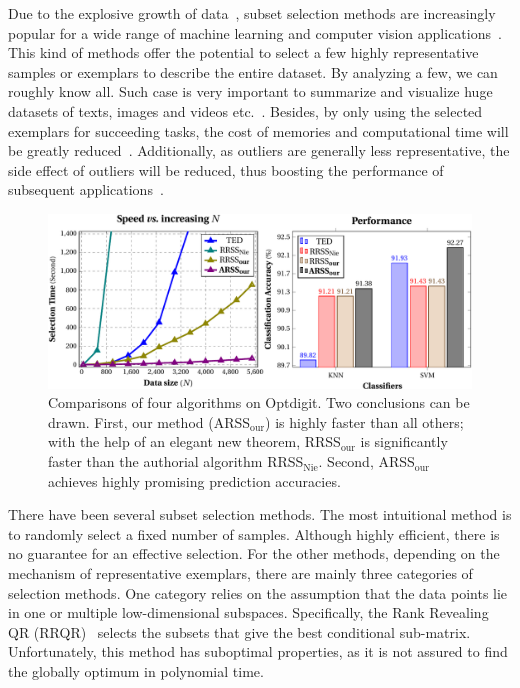 \documentclass[a4paper]{article}
\begin{document}
Due to the explosive growth of data\ \cite{junWang_2012_PAMI_SemiSupHash},
subset selection methods are increasingly popular for a wide range
of machine learning and computer vision applications\ \cite{Frey_2007_Science_ClusteringViaPassingMessages,Jenatton_2011_JMLR_SelectionViaSparsityInducingNorms}.
This kind of methods offer the potential to select a few highly representative
samples or exemplars to describe the entire dataset. By analyzing
a few, we can roughly know all. Such case is very important to summarize
and visualize huge datasets of texts, images and videos etc.\ \cite{Bien_2012_AAS_prototypeSelection_4_Interpret,Elhamifar_2012_NIPS_ExemplarsbyPairwise}.
Besides, by only using the selected exemplars for succeeding tasks,
the cost of memories and computational time will be greatly reduced\ \cite{Garcia_2012_PAMI_PrototypeSelection_4_KNN}.
Additionally, as outliers are generally less representative, the side
effect of outliers will be reduced, thus boosting the performance
of subsequent applications\ \cite{Elhamifar_2012_CVPR_SeeAllLookFew}.
\begin{figure}[t]
\centering{}\includegraphics[width=1\columnwidth]{0F__important_doingWork_myWorks_AAAI2015_figs_firstIllustration_speed_accuarcy_v2-crop.pdf}
\caption{{\footnotesize{Comparisons of four algorithms on Optdigit. Two conclusions
can be drawn. First, our method (ARSS$_{\text{our}}$) is highly faster
than all others; with the help of an elegant new theorem, RRSS$_{\text{our}}$
is significantly faster than the authorial algorithm RRSS$_{\text{Nie}}$.
Second, ARSS$_{\text{our}}$ achieves highly promising prediction
accuracies. }}{\small{\label{fig:compare_4_methods_Optdigit}}}}
\end{figure}
 

There have been several subset selection methods. The most intuitional
method is to randomly select a fixed number of samples. Although highly
efficient, there is no guarantee for an effective selection. For the
other methods, depending on the mechanism of representative exemplars,
there are mainly three categories of selection methods. One category
relies on the assumption that the data points lie in one or multiple
low-dimensional subspaces. Specifically, the Rank Revealing QR (RRQR)\ \cite{Chan_1987_LAIA_RRQR,Boutsidis_2009_SODA_RRQR_2}
selects the subsets that give the best conditional sub-matrix. Unfortunately,
this method has suboptimal properties, as it is not assured to find
the globally optimum in polynomial time. 
\end{document}

